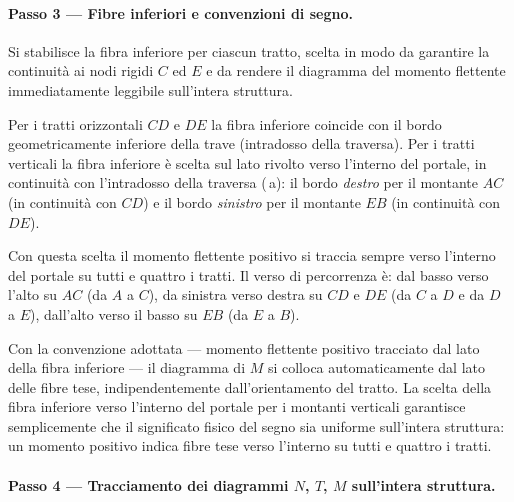 \paragraph{Passo 3 --- Fibre inferiori e convenzioni di segno.}

Si stabilisce la fibra inferiore per ciascun tratto,
scelta in modo da garantire la continuità ai nodi rigidi
$C$ ed $E$ e da rendere il diagramma del momento flettente
immediatamente leggibile sull'intera struttura.

Per i tratti orizzontali $CD$ e $DE$ la fibra inferiore
coincide con il bordo geometricamente inferiore della trave
(intradosso della traversa).
Per i tratti verticali la fibra inferiore è scelta sul lato
rivolto verso l'interno del portale, in continuità con
l'intradosso della traversa (\,a):
il bordo \emph{destro} per il montante $AC$
(in continuità con $CD$) e il bordo \emph{sinistro}
per il montante $EB$ (in continuità con $DE$).

Con questa scelta il momento flettente positivo si traccia
sempre verso l'interno del portale su tutti e quattro i tratti.
Il verso di percorrenza è:
dal basso verso l'alto su $AC$ (da $A$ a $C$),
da sinistra verso destra su $CD$ e $DE$ (da $C$ a $D$
e da $D$ a $E$),
dall'alto verso il basso su $EB$ (da $E$ a $B$).

\begin{oss}
	Con la convenzione adottata --- momento flettente
	positivo tracciato dal lato della fibra inferiore
	--- il diagramma di $M$ si colloca automaticamente
	dal lato delle fibre tese, indipendentemente
	dall'orientamento del tratto. La scelta della fibra
	inferiore verso l'interno del portale per i montanti
	verticali garantisce semplicemente che il significato
	fisico del segno sia uniforme sull'intera struttura:
	un momento positivo indica fibre tese verso l'interno
	su tutti e quattro i tratti.
\end{oss}



\paragraph{Passo 4 --- Tracciamento dei diagrammi
	$N$, $T$, $M$ sull'intera struttura.}

